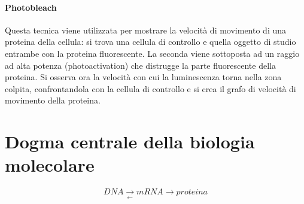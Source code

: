 \paragraph{Photobleach}
Questa tecnica viene utilizzata per mostrare la velocit\`a di movimento di una proteina della cellula: si trova una cellula di controllo e quella oggetto di 
studio entrambe con la proteina fluorescente. La seconda viene sottoposta ad un raggio ad alta potenza (photoactivation) che distrugge la parte fluorescente
della proteina. Si osserva ora la velocit\`a con cui la luminescenza torna nella zona colpita, confrontandola con la cellula di controllo e si crea il grafo
di velocit\`a di movimento della proteina.
\section{Dogma centrale della biologia molecolare}
$$DNA\xrightarrow[\leftarrow]{}mRNA\rightarrow proteina$$
